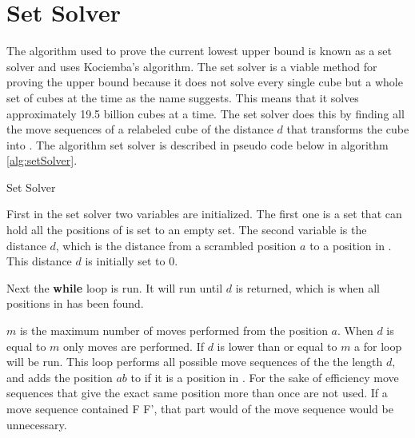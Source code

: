 \section{Set Solver}
\label{sec:setSolver}
The algorithm used to prove the current lowest upper bound is known as a set solver and uses Kociemba's algorithm. The set solver is a viable method for proving the upper bound because it does not solve every single cube but a whole set of cubes at the time as the name suggests. This means that it solves approximately 19.5 billion cubes at a time.
The set solver does this by finding all the move sequences of a relabeled cube of the distance $d$ that transforms the cube into . 
The algorithm set solver is described in pseudo code below in algorithm \ref{alg:setSolver}.%

\begin{algorithm}[!h]                     
\caption{Set Solver \cite{rokicki09}}          
\label{alg:setSolver}        
\begin{algorithmic}[1]
				\ENDIF
			\ENDFOR
		\ENDIF
		\ENDIF
	\ENDIF
\ENDWHILE
\end{algorithmic}
\end{algorithm}

First in the set solver two variables are initialized. The first one  is a set that can hold all the positions of  is set to an empty set. The second variable is the distance $d$, which is the distance from a scrambled position $a$ to a position in . This distance $d$ is initially set to $0$.

Next the \textbf{while} loop is run. It will run until $d$ is returned, which is when all positions in  has been found.

$m$ is the maximum number of  moves performed from the position $a$. When $d$ is equal to $m$ only  moves are performed.
If $d$ is lower than or equal to $m$ a for loop will be run. This loop performs all possible move sequences of the the length $d$, and adds the position $ab$ to  if it is a position in . 
For the sake of efficiency move sequences that give the exact same position more than once are not used. If a move sequence contained F F', that part would  of the move sequence would be unnecessary. 

